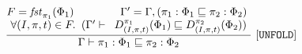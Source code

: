 \begin{gather*}
\frac{ \begin{matrix}
\text{{\tt{\ensuremath{F = \mathit{fst}_{{\pi_1}}(\textcolor{black}{\mathrm{\Phi}}_1)\qquad\qquad \Gamma^\prime = \Gamma,  (
{\pi_1} : \textcolor{black}{\mathrm{\Phi}}_1 \sqsubseteq {\pi_2} : \textcolor{black}{\mathrm{\Phi}}_2
)}}} }\\
    \text{{\tt{\ensuremath{\forall (I, \pi, t)\in F. \   (\Gamma^\prime  \vdash \   D_{(I, \pi, t)}^{{\pi_1}}( \textcolor{black}{\mathrm{\Phi}}_1) \sqsubseteq    D_{(I, \pi, t)}^{{\pi_2}}( \textcolor{black}{\mathrm{\Phi}}_2) )}}}}
  \end{matrix}}
   { \text{{\tt{\ensuremath{  \Gamma  \vdash {\pi_1} : \textcolor{black}{\mathrm{\Phi}}_1 \sqsubseteq {\pi_2} : \textcolor{black}{\mathrm{\Phi}}_2 }}}}}\  {\tt{\ensuremath{[UNFOLD]}}} 
\end{gather*}
